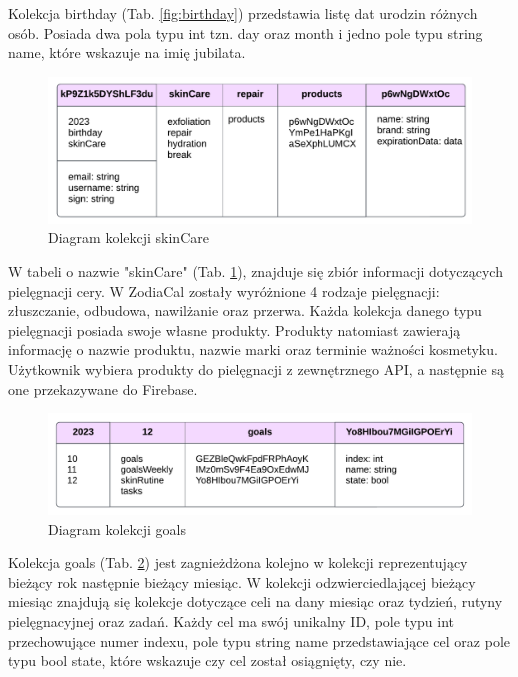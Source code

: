 Kolekcja birthday (Tab. \ref{fig:birthday}) przedstawia listę dat urodzin różnych osób. Posiada dwa pola typu int tzn. day oraz month i jedno pole typu string name, które wskazuje na imię jubilata.

\begin{figure}[h]
	\centering
	\includegraphics[width=1\linewidth]{images/model_danych/skinCare}
	\caption{Diagram kolekcji skinCare}
	\label{fig:skinCare}
\end{figure}

W tabeli o nazwie "skinCare" (Tab. \ref{fig:skinCare}), znajduje się zbiór informacji dotyczących pielęgnacji cery. W ZodiaCal zostały wyróżnione 4 rodzaje pielęgnacji: złuszczanie, odbudowa, nawilżanie oraz przerwa. Każda kolekcja danego typu pielęgnacji posiada swoje własne produkty. Produkty natomiast zawierają informację o nazwie produktu, nazwie marki oraz terminie ważności kosmetyku. Użytkownik wybiera produkty do pielęgnacji z zewnętrznego API, a następnie są one przekazywane do Firebase.

\begin{figure}[h]
	\centering
	\includegraphics[width=1\linewidth]{images/model_danych/goals}
	\caption{Diagram kolekcji goals}
	\label{fig:goals}
\end{figure}

Kolekcja goals (Tab. \ref{fig:goals}) jest zagnieżdżona kolejno w kolekcji reprezentujący bieżący rok następnie bieżący miesiąc. W kolekcji odzwierciedlającej bieżący miesiąc znajdują się kolekcje dotyczące celi na dany miesiąc oraz tydzień, rutyny pielęgnacyjnej oraz zadań. Każdy cel ma swój unikalny ID, pole typu int przechowujące numer indexu, pole typu string name przedstawiające cel oraz pole typu bool state, które wskazuje czy cel został osiągnięty, czy nie.

